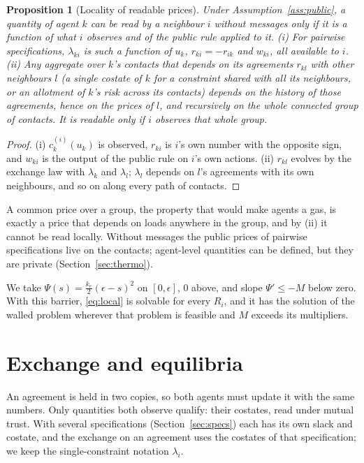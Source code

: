 \documentclass[11pt]{article}
\newtheorem{proposition}[theorem]{Proposition}
\theoremstyle{definition}
\theoremstyle{remark}
\begin{document}
\begin{proposition}[Locality of readable prices]\label{prop:local}
Under Assumption~\ref{ass:public}, a quantity of agent $k$ can be read by a neighbour $i$ without messages only if it is a function of what $i$ observes and of the public rule applied to it. (i) For pairwise specifications, $\lambda_{ki}$ is such a function of $u_k$, $r_{ki}=-r_{ik}$ and $w_{ki}$, all available to $i$. (ii) Any aggregate over $k$'s contacts that depends on its agreements $r_{kl}$ with other neighbours $l$ (a single costate of $k$ for a constraint shared with all its neighbours, or an allotment of $k$'s risk across its contacts) depends on the history of those agreements, hence on the prices of $l$, and recursively on the whole connected group of contacts. It is readable only if $i$ observes that whole group.
\end{proposition}
\begin{proof}
(i) $c^{(i)}_k(u_k)$ is observed, $r_{ki}$ is $i$'s own number with the opposite sign, and $w_{ki}$ is the output of the public rule on $i$'s own actions. (ii) $r_{kl}$ evolves by the exchange law with $\lambda_k$ and $\lambda_l$; $\lambda_l$ depends on $l$'s agreements with its own neighbours, and so on along every path of contacts.
\end{proof}

A common price over a group, the property that would make agents a gas, is exactly a price that depends on loads anywhere in the group, and by (ii) it cannot be read locally. Without messages the public prices of pairwise specifications live on the contacts; agent-level quantities can be defined, but they are private (Section~\ref{sec:thermo}).

We take $\Psi(s)=\frac{k_e}{2}(\epsilon-s)^2$ on $[0,\epsilon]$, $0$ above, and slope $\Psi'\le-M$ below zero. With this barrier, \eqref{eq:local} is solvable for every $R_i$, and it has the solution of the walled problem wherever that problem is feasible and $M$ exceeds its multipliers.

\section{Exchange and equilibria}\label{sec:exchange}
An agreement is held in two copies, so both agents must update it with the same numbers. Only quantities both observe qualify: their costates, read under mutual trust. With several specifications (Section~\ref{sec:specs}) each has its own slack and costate, and the exchange on an agreement uses the costates of that specification; we keep the single-constraint notation $\lambda_i$.
\end{document}
